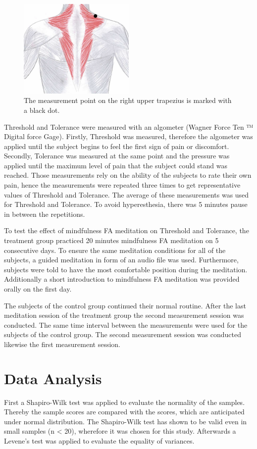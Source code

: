 \begin{figure}[H]
	\includegraphics[width=0.5\textwidth]{figures/trapezius} 
	\caption{The measurement point on the right upper trapezius is marked with a black dot.}
	\label{fig:trapezius}  
\end{figure}  

Threshold and Tolerance were measured with an algometer (Wagner Force Ten ™  Digital force Gage). Firstly, Threshold was measured, therefore the algometer was applied until the subject begins to feel the first sign of pain or discomfort. Secondly, Tolerance was measured at the same point and the pressure was applied until the maximum level of pain that the subject could stand was reached. Those measurements rely on the ability of the subjects to rate their own pain, hence the measurements were repeated three times to get representative values of Threshold and Tolerance. The average of these measurements was used for Threshold and Tolerance. To avoid hyperesthesia, there was 5 minutes pause in between the repetitions. 

To test the effect of mindfulness FA meditation on Threshold and Tolerance, the treatment group practiced 20 minutes mindfulness FA meditation on 5 consecutive days. To ensure the same meditation conditions for all of the subjects, a guided meditation in form of an audio file was used. Furthermore, subjects were told to have the most comfortable position during the meditation.  Additionally a short introduction to mindfulness FA meditation was provided orally on the first day. 

The subjects of the control group continued their normal routine.
After the last meditation session of the treatment group the second measurement session was conducted. The same time interval between the measurements were used for the subjects of the control group. The second measurement session was conducted likewise the first measurement session.


\section{Data Analysis}
First a Shapiro-Wilk test was applied to evaluate the normality of the samples. Thereby the sample scores are compared with the scores, which are anticipated under normal distribution. The Shapiro-Wilk test has shown to be valid even in small samples (n < 20), wherefore it was chosen for this study. \cite{Shapiro1965,Mooi2018} Afterwards a Levene’s test was applied to evaluate the equality of variances.

